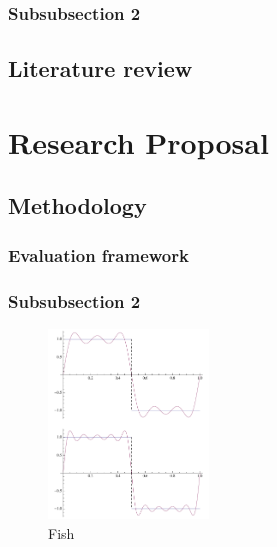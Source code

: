 \documentclass[12pt]{article} %
\theoremstyle{plain}
\theoremstyle{definition}
\theoremstyle{remark}
\begin{document}

\subsubsection{Subsubsection 2} %

\lipsum[4] %

\subsection{Literature review}


\section{Research Proposal} %

\lipsum[5] %


\subsection{Methodology} %

\subsubsection{Evaluation framework} %

\lipsum[6] %


\subsubsection{Subsubsection 2} %

\lipsum[6] %
\begin{figure} %
  \begin{center}
    \includegraphics[width=0.38\textwidth]{fourier}
  \end{center}
  \caption{Fish}
\end{figure}
\lipsum[7-8] %
\end{document}

